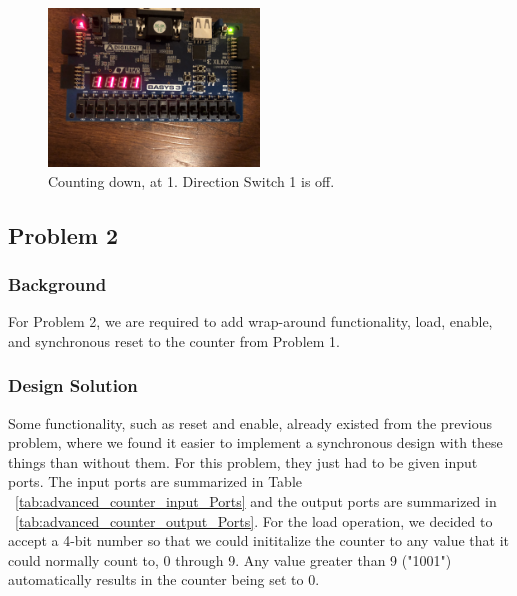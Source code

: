 \documentclass[11pt]{article}
\begin{document}
\begin{figure}[H]
\begin{center}
	\includegraphics[width=0.5\textwidth]{./images/p1/IMG_1006.jpg}
	\caption{\label{fig:counter_res6}Counting down, at 1. Direction Switch 1 is off.}
\end{center}
\end{figure}

\subsection{Problem 2 }

\subsubsection{Background}
For Problem 2, we are required to add wrap-around functionality, load, enable, and synchronous reset to the counter from Problem 1.

\subsubsection{Design Solution}
Some functionality, such as reset and enable, already existed from the previous problem, where we found it easier to implement a synchronous design with these things than without them. For this problem, they just had to be given input ports. The input ports are summarized in Table ~\ref{tab:advanced_counter_input_Ports} and the output ports are summarized in ~\ref{tab:advanced_counter_output_Ports}. For the load operation, we decided to accept a 4-bit number so that we could inititalize the counter to any value that it could normally count to, 0 through 9. Any value greater than 9 ("1001") automatically results in the counter being set to 0.
\end{document}
